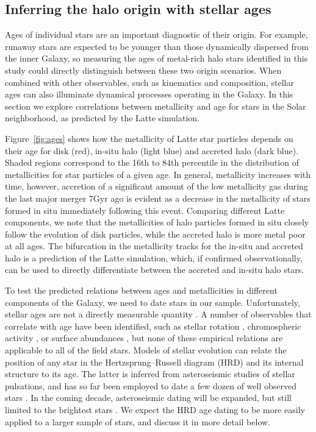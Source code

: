 \documentclass[apj, twocolappendix, numberedappendix, appendixfloats]{emulateapj}
\begin{document}
\subsection{Inferring the halo origin with stellar ages}
\label{sec:ages}
Ages of individual stars are an important diagnostic of their origin.
For example, runaway stars are expected to be younger than those dynamically dispersed from the inner Galaxy, so measuring the ages of metal-rich halo stars identified in this study could directly distinguish between these two origin scenarios.
When combined with other observables, such as kinematics and composition, stellar ages can also illuminate dynamical processes operating in the Galaxy.
In this section we explore correlations between metallicity and age for stars in the Solar neighborhood, as predicted by the Latte simulation.

Figure~\ref{fig:ages} shows how the metallicity of Latte star particles depends on their age for disk (red), in-situ halo (light blue) and accreted halo (dark blue).
Shaded regions correspond to the 16th to 84th percentile in the distribution of metallicities for star particles of a given age.
In general, metallicity increases with time, however, accretion of a significant amount of the low metallicity gas during the last major merger 7\;Gyr ago is evident as a decrease in the metallicity of stars formed in situ immediately following this event.
Comparing different Latte components, we note that the metallicities of halo particles formed in situ closely follow the evolution of disk particles, while the accreted halo is more metal poor at all ages.
The bifurcation in the metallicity tracks for the in-situ and accreted halo is a prediction of the Latte simulation, which, if confirmed observationally, can be used to directly differentiate between the accreted and in-situ halo stars.

To test the predicted relations between ages and metallicities in different components of the Galaxy, we need to date stars in our sample.
Unfortunately, stellar ages are not a directly measurable quantity \citep[for a recent review, see][]{soderblom2010}.
A number of observables that correlate with age have been identified, such as stellar rotation \citep{barnes2007}, chromospheric activity \citep{mamajek2008}, or surface abundances \citep{ness2016}, but none of these empirical relations are applicable to all of the field stars.
Models of stellar evolution can relate the position of any star in the Hertzsprung--Russell diagram (HRD) and its internal structure to its age.
The latter is inferred from asteroseismic studies of stellar pulsations, and has so far been employed to date a few dozen of well observed stars \citep[e.g.,][]{keplerages}.
In the coming decade, asteroseismic dating will be expanded, but still limited to the brightest stars \citep{tess, plato}.
We expect the HRD age dating to be more easily applied to a larger sample of stars, and discuss it in more detail below.
\end{document}
